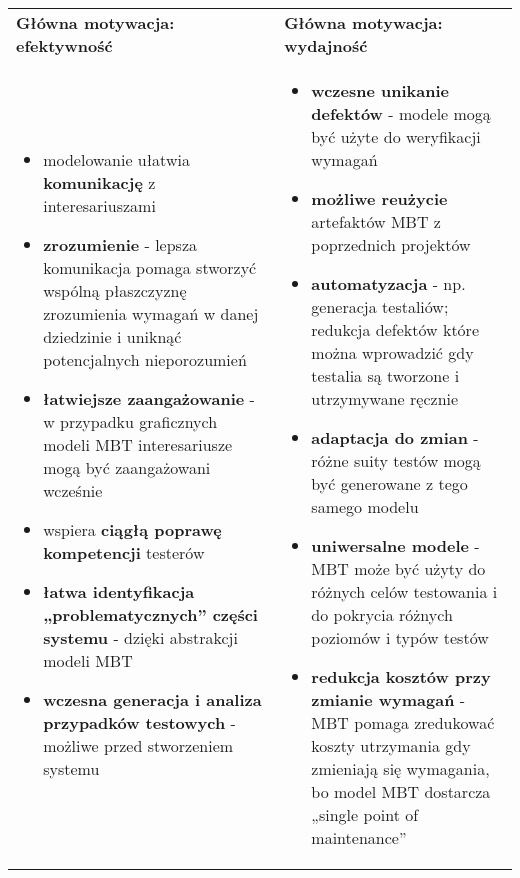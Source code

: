 \documentclass[../main.tex]{subfiles}
\begin{document}
    \begin{table}[H]
        \begin{center}
            \begin{tabular}{p{8cm} p{8cm}}
                \textbf{Główna motywacja: efektywność} & \textbf{Główna motywacja: wydajność}\\
                \begin{itemize}
                    \item modelowanie ułatwia \textbf{komunikację} z interesariuszami
                    \item \textbf{zrozumienie} - lepsza komunikacja pomaga stworzyć wspólną
                    płaszczyznę zrozumienia wymagań w danej dziedzinie i uniknąć potencjalnych nieporozumień
                    \item \textbf{łatwiejsze zaangażowanie} - w przypadku graficznych modeli MBT interesariusze
                    mogą być zaangażowani wcześnie
                    \item wspiera \textbf{ciągłą poprawę kompetencji} testerów
                    \item \textbf{łatwa identyfikacja „problematycznych” części systemu} - dzięki abstrakcji modeli MBT
                    \item \textbf{wczesna generacja i analiza przypadków testowych} - możliwe przed stworzeniem systemu
                \end{itemize}
                &
                \begin{itemize}
                    \item \textbf{wczesne unikanie defektów} - modele mogą być użyte do weryfikacji wymagań
                    \item \textbf{możliwe reużycie} artefaktów MBT z poprzednich projektów
                    \item \textbf{automatyzacja} - np. generacja testaliów; redukcja defektów które można
                    wprowadzić gdy testalia są tworzone i utrzymywane ręcznie
                    \item \textbf{adaptacja do zmian} - różne suity testów mogą być generowane z tego samego modelu
                    \item \textbf{uniwersalne modele} - MBT może być użyty do różnych celów testowania i do pokrycia
                    różnych poziomów i typów testów
                    \item \textbf{redukcja kosztów przy zmianie wymagań} - MBT pomaga zredukować koszty utrzymania gdy
                    zmieniają się wymagania, bo model MBT dostarcza „single point of maintenance”
                \end{itemize}\\
            \end{tabular}
        \end{center}
    \end{table}
\end{document}
